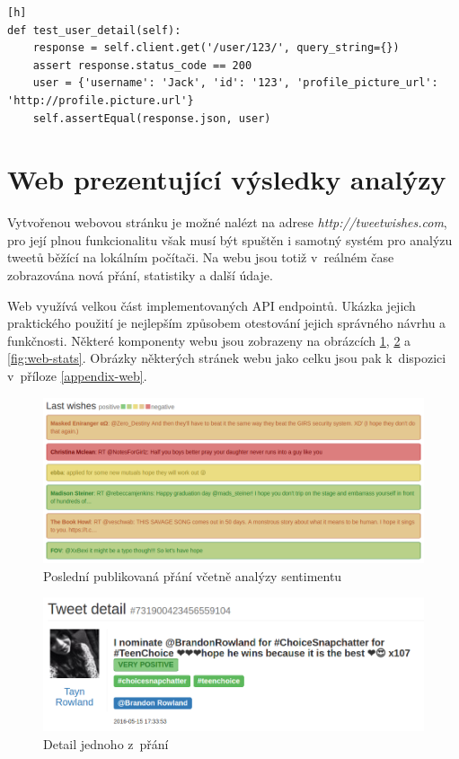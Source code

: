 \documentclass[thesis=B,czech]{FITthesis}[2012/06/26]
\begin{document}
\begin{lstlisting}[caption={Test endpointu /user/<user\_id>},label=user-test][h]
def test_user_detail(self):
	response = self.client.get('/user/123/', query_string={})
	assert response.status_code == 200
	user = {'username': 'Jack', 'id': '123', 'profile_picture_url': 'http://profile.picture.url'}
	self.assertEqual(response.json, user)
\end{lstlisting}


\section{Web prezentující výsledky analýzy}
Vytvořenou webovou stránku je možné nalézt na adrese \textit{http://tweetwishes.com}, pro její plnou funkcionalitu však musí být spuštěn i samotný systém pro analýzu tweetů běžící na lokálním počítači. Na webu jsou totiž v~reálném čase zobrazována nová přání, statistiky a další údaje. 

Web využívá velkou část implementovaných API endpointů. Ukázka jejich praktického použití je nejlepším způsobem otestování jejich správného návrhu a funkčnosti. Některé komponenty webu jsou zobrazeny na obrázcích \ref{fig:web-last-tweets}, \ref{fig:web-detail} a \ref{fig:web-stats}. Obrázky některých stránek webu jako celku jsou pak k~dispozici v~příloze \ref{appendix-web}. 

	\begin{figure}[ht]
    	\centering
    	\includegraphics[width=1\textwidth]{images/web-wishes.png}
    	\caption{Poslední publikovaná přání včetně analýzy sentimentu}
    	\label{fig:web-last-tweets}
	\end{figure}

	\begin{figure}[ht]
    	\centering
    	\includegraphics[width=1\textwidth]{images/web-detail.png}
    	\caption{Detail jednoho z~přání}
    	\label{fig:web-detail}
	\end{figure}
	
\end{document}
